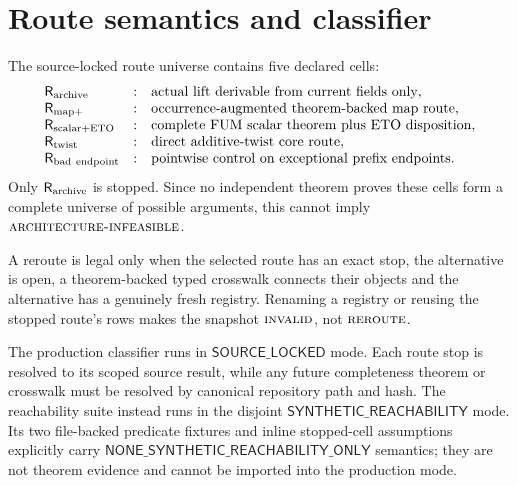 \documentclass[11pt]{article}
\theoremstyle{definition}
\theoremstyle{remark}
\newcommand{\AINF}{\textnormal{\textsc{architecture-infeasible}}}
\newcommand{\REROUTE}{\textnormal{\textsc{reroute}}}
\newcommand{\INVALID}{\textnormal{\textsc{invalid}}}
\begin{document}
\section{Route semantics and classifier}

The source-locked route universe contains five declared cells:
\[
\begin{array}{lll}
\mathsf{R}_{\rm archive}&:&
\text{actual lift derivable from current fields only},\\
\mathsf{R}_{\rm map+}&:&
\text{occurrence-augmented theorem-backed map route},\\
\mathsf{R}_{\rm scalar+ETO}&:&
\text{complete FUM scalar theorem plus ETO disposition},\\
\mathsf{R}_{\rm twist}&:&
\text{direct additive-twist core route},\\
\mathsf{R}_{\rm bad\ endpoint}&:&
\text{pointwise control on exceptional prefix endpoints}.
\end{array}
\]
Only \(\mathsf{R}_{\rm archive}\) is stopped.  Since no independent
theorem proves these cells form a complete universe of possible
arguments, this cannot imply \(\AINF\).

A reroute is legal only when the selected route has an exact stop, the
alternative is open, a theorem-backed typed crosswalk connects their
objects and the alternative has a genuinely fresh registry.  Renaming
a registry or reusing the stopped route's rows makes the snapshot
\(\INVALID\), not \(\REROUTE\).

The production classifier runs in \(\mathsf{SOURCE\_LOCKED}\) mode.
Each route stop is resolved to its scoped source result, while any
future completeness theorem or crosswalk must be resolved by
canonical repository path and hash.  The reachability suite instead
runs in the disjoint
\(\mathsf{SYNTHETIC\_REACHABILITY}\) mode.  Its two file-backed
predicate fixtures and inline stopped-cell assumptions explicitly
carry
\(\mathsf{NONE\_SYNTHETIC\_REACHABILITY\_ONLY}\) semantics; they are
not theorem evidence and cannot be imported into the production mode.
\end{document}
